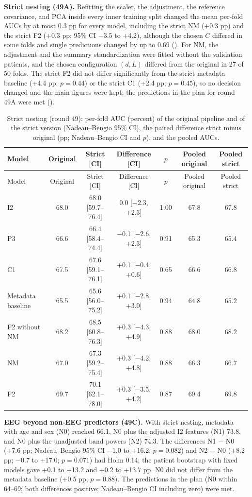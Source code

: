 \textbf{Strict nesting (49A).} Refitting the scaler, the adjustment, the reference covariance, and PCA inside every inner training split changed the mean per-fold AUCs by at most 0.3 pp for every model, including the strict NM (+0.3 pp) and the strict F2 (+0.3 pp; 95\% CI $-$3.5 to +4.2), although the chosen $C$ differed in some folds and single predictions changed by up to 0.69 (). For NM, the adjustment and the summary standardization were fitted without the validation patients, and the chosen configuration $(d, L)$ differed from the original in 27 of 50 folds. The strict F2 did not differ significantly from the strict metadata baseline (+4.4 pp; $p = 0.44$) or the strict C1 (+2.4 pp; $p = 0.45$), so no decision changed and the main figures were kept; the predictions in the plan for round 49A were met ().
{\scriptsize
\setlength{\tabcolsep}{2.5pt}
\begin{longtable}{p{}cccccc}
\caption{Strict nesting (round 49): per-fold AUC (percent) of the original pipeline and of the strict version (Nadeau--Bengio 95\% CI), the paired difference strict minus original (pp; Nadeau--Bengio CI and $p$), and the pooled AUCs.}\label{tab:s2_ketat}\label{tab:s1_ketat}\\
\toprule
Model & Original & Strict [CI] & Difference [CI] & $p$ & Pooled original & Pooled strict \\
\midrule
\endfirsthead
\toprule
Model & Original & Strict [CI] & Difference [CI] & $p$ & Pooled original & Pooled strict \\
\midrule
\endhead
\bottomrule
\endfoot
I2 & 68.0 & 68.0 [59.7--76.4] & 0.0 [$-$2.3, +2.3] & 1.00 & 67.8 & 67.8 \\
P3 & 66.6 & 66.4 [58.4--74.4] & $-$0.1 [$-$2.6, +2.3] & 0.91 & 65.3 & 65.4 \\
C1 & 67.5 & 67.6 [59.1--76.1] & +0.1 [$-$0.4, +0.6] & 0.65 & 66.6 & 66.8 \\
Metadata baseline & 65.5 & 65.6 [56.0--75.2] & +0.1 [$-$2.8, +3.0] & 0.94 & 64.8 & 65.2 \\
F2 without NM & 68.2 & 68.5 [60.8--76.3] & +0.3 [$-$4.3, +4.9] & 0.88 & 68.0 & 68.2 \\
NM & 67.0 & 67.3 [59.2--75.4] & +0.3 [$-$4.2, +4.8] & 0.88 & 66.3 & 66.7 \\
F2 & 69.7 & 70.1 [62.1--78.0] & +0.3 [$-$3.5, +4.2] & 0.87 & 69.4 & 69.8 \\
\end{longtable}
}

\textbf{EEG beyond non-EEG predictors (49C).} With strict nesting, metadata with age and sex (N0) reached 66.1, N0 plus the adjusted I2 features (N1) 73.8, and N0 plus the unadjusted band powers (N2) 74.3. The differences N1 $-$ N0 (+7.6 pp; Nadeau--Bengio 95\% CI $-$1.0 to +16.2; $p = 0.082$) and N2 $-$ N0 (+8.2 pp; $-$0.7 to +17.0; $p = 0.071$) had Holm 0.14; the patient bootstrap with fixed models gave +0.1 to +13.2 and +0.2 to +13.7 pp. N0 did not differ from the metadata baseline (+0.5 pp; $p = 0.88$). The predictions in the plan (N0 within 64--69; both differences positive; Nadeau--Bengio CI including zero) were met.

